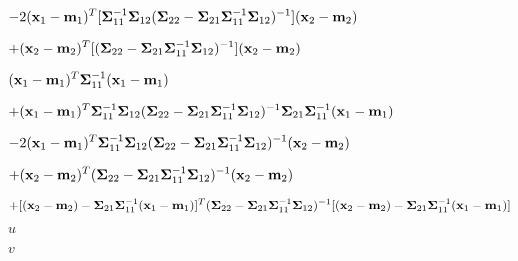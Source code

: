 \documentclass{article}
\def\lthtmlcheckvsize{\ifdim\ht\sizebox<\vsize 
  \ifdim\wd\sizebox<\hsize\expandafter\hfill\fi \expandafter\vfill
  \else\expandafter\vss\fi}%
\begin{document}
{\newpage\clearpage
{}%
$\displaystyle -2({\bf x}_1-{\bf m}_1)^T [{\bf\Sigma}_{11}^{-1}{\bf\Sigma}_{12}({\bf\Sigma}_{22}-{\bf\Sigma}_{21}{\bf\Sigma}_{11}^{-1}{\bf\Sigma}_{12})^{-1}] ({\bf x}_2-{\bf m}_2)$%
\lthtmlindisplaymathZ
\lthtmlcheckvsize\clearpage}

{\newpage\clearpage
{}%
$\displaystyle +({\bf x}_2-{\bf m}_2)^T [({\bf\Sigma}_{22}-{\bf\Sigma}_{21}{\bf\Sigma}_{11}^{-1}{\bf\Sigma}_{12})^{-1}]
({\bf x}_2-{\bf m}_2)$%
\lthtmlindisplaymathZ
\lthtmlcheckvsize\clearpage}

{\newpage\clearpage
{}%
$\displaystyle ({\bf x}_1-{\bf m}_1)^T {\bf\Sigma}_{11}^{-1} ({\bf x}_1-{\bf m}_1)$%
\lthtmlindisplaymathZ
\lthtmlcheckvsize\clearpage}

{\newpage\clearpage
{}%
$\displaystyle +({\bf x}_1-{\bf m}_1)^T {\bf\Sigma}_{11}^{-1}{\bf\Sigma}_{12}({\bf\Sigma}_{22}-{\bf\Sigma}_{21}{\bf\Sigma}_{11}^{-1}{\bf\Sigma}_{12})^{-1}{\bf\Sigma}_{21}{\bf\Sigma}_{11}^{-1} ({\bf x}_1-{\bf m}_1)$%
\lthtmlindisplaymathZ
\lthtmlcheckvsize\clearpage}

{\newpage\clearpage
{}%
$\displaystyle -2({\bf x}_1-{\bf m}_1)^T {\bf\Sigma}_{11}^{-1}{\bf\Sigma}_{12}({\bf\Sigma}_{22}-{\bf\Sigma}_{21}{\bf\Sigma}_{11}^{-1}{\bf\Sigma}_{12})^{-1} ({\bf x}_2-{\bf m}_2)$%
\lthtmlindisplaymathZ
\lthtmlcheckvsize\clearpage}

{\newpage\clearpage
{}%
$\displaystyle +({\bf x}_2-{\bf m}_2)^T ({\bf\Sigma}_{22}-{\bf\Sigma}_{21}{\bf\Sigma}_{11}^{-1}{\bf\Sigma}_{12})^{-1} ({\bf x}_2-{\bf m}_2)$%
\lthtmlindisplaymathZ
\lthtmlcheckvsize\clearpage}

{\newpage\clearpage
{}%
$\displaystyle +[({\bf x}_2-{\bf m}_2)-{\bf\Sigma}_{21}{\bf\Sigma}_{11}^{-1}({\bf x}_1-{\bf m}_1)]^T
({\bf\Sigma}_{22}-{\bf\Sigma}_{21}{\bf\Sigma}_{11}^{-1}{\bf\Sigma}_{12})^{-1} [({\bf x}_2-{\bf m}_2)-{\bf\Sigma}_{21}{\bf\Sigma}_{11}^{-1}({\bf x}_1-{\bf m}_1)]$%
\lthtmlindisplaymathZ
\lthtmlcheckvsize\clearpage}

{\newpage\clearpage
{}%
$ u$%
\lthtmlindisplaymathZ
\lthtmlcheckvsize\clearpage}

{\newpage\clearpage
{}%
$ v$%
\lthtmlindisplaymathZ
\lthtmlcheckvsize\clearpage}
\end{document}
